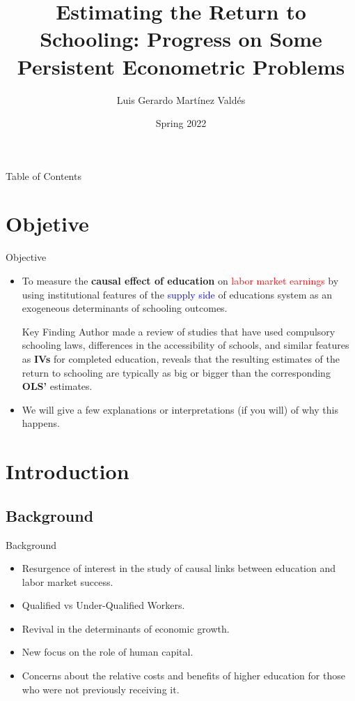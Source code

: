 \documentclass{beamer}
\title[Advanced MicroEconometrics]
{Estimating the Return to Schooling: Progress on Some Persistent Econometric Problems}
\author[Luis Martínez] 
{Luis Gerardo Martínez Valdés}
\institute{ITAM}
\date{Spring 2022}
\newcommand\Fontvi{\fontsize{6}{7.5}\selectfont}
\begin{document}
\frame{\titlepage}

\begin{frame}{Table of Contents}
\Fontvi
\tableofcontents
\end{frame}

\section{Objetive}
\begin{frame}{Objective}
 \begin{itemize}
     \item To measure the \textbf{causal effect of education} on \textcolor{red}{labor market earnings} by using institutional features of the \textcolor{blue}{supply side} of educations system as an exogeneous determinants of schooling outcomes.
     
 \begin{block}{Key Finding}
Author made a review of studies that have used compulsory schooling laws, differences in the accessibility of schools, and similar features as \textbf{IVs} for completed education, reveals that the resulting estimates of the return to schooling are typically as big or bigger than the corresponding \textbf{OLS'} estimates.
\end{block}

    \item We will give a few explanations or interpretations (if you will) of why this happens.
 \end{itemize}
\end{frame}



\section{Introduction}
\subsection{Background}
\begin{frame}{Background}

   \begin{itemize}
       \item Resurgence of interest in the study of causal links between education and labor market success. 
       \item Qualified vs Under-Qualified Workers.
       \item Revival in the determinants of economic growth.
       \item New focus on the role of human capital.
       \item Concerns about the relative costs and benefits of higher education for those who were not previously receiving it.
   \end{itemize}
   
   
\end{frame}
\end{document}

